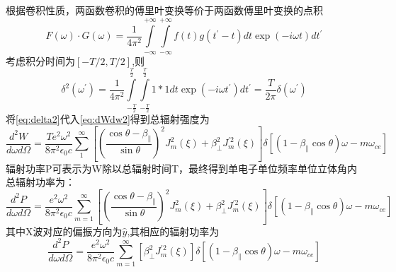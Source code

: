 根据卷积性质，两函数卷积的傅里叶变换等价于两函数傅里叶变换的点积
\begin{equation}
F(\omega) \cdot G(\omega)=\frac{1}{4 \pi^{2}} \int\limits_{-\infty}^{+\infty}\int\limits_{-\infty}^{+\infty} f(t) g\left(t^{\prime}-t\right)d t \exp (-i \omega t) d t^{\prime}
\end{equation}
考虑积分时间为$[-T/2,T/2]$,则
\begin{equation}\label{eq:delta2}
\delta^{2}\left(\omega^{\prime}\right)=\frac{1}{4 \pi^{2}} \int\limits_{-\frac{T}{2}}^{\frac{T}{2}}\int\limits_{-\frac{T}{2}}^{\frac{T}{2}} 1 * 1 d t \exp \left(-i \omega t^{\prime}\right) d t^{\prime}=\frac{T}{2 \pi} \delta\left(\omega^{\prime}\right)
\end{equation}
将\autoref{eq:delta2}代入\autoref{eq:dWdw2}得到总辐射强度为
\begin{equation}
\frac{d^{2} W}{d \omega d \Omega}=\frac{T e^{2} \omega^{2}}{8 \pi^{2} \epsilon_{0} c} \sum_{1}^{\infty}\left[\left(\frac{\cos \theta-\beta_{\|}}{\sin \theta}\right)^{2} J_{m}^{2}(\xi)+\beta_{\perp}^{2} J_{m}^{\prime 2}(\xi)\right] \delta\left[\left(1-\beta_{\|} \cos \theta\right) \omega-m \omega_{c e}\right]
\end{equation}
辐射功率P可表示为W除以总辐射时间T，最终得到单电子单位频率单位立体角内总辐射功率为：
\begin{equation}
\frac{d^{2} P}{d \omega d \Omega}=\frac{e^{2} \omega^{2}}{8 \pi^{2} \epsilon_{0} c} \sum_{m=1}^{\infty}\left[\left(\frac{\cos \theta-\beta_{\|}}{\sin \theta}\right)^{2} J_{m}^{2}(\xi)+\beta_{\perp}^{2} J_{m}^{\prime 2}(\xi)\right] \delta\left[\left(1-\beta_{\|} \cos \theta\right)\omega-m \omega_{c e}\right]
\end{equation}
其中X波对应的偏振方向为$\hat{y}$,其相应的辐射功率为
\begin{equation}\label{eq:Xradiation}
\frac{d^{2} P}{d \omega d \Omega}=\frac{e^{2} \omega^{2}}{8 \pi^{2} \epsilon_{0} c} \sum_{m=1}^{\infty}\left[\beta_{\perp}^{2} J_{m}^{\prime 2}(\xi)\right] \delta\left[\left(1-\beta_{\|} \cos \theta\right)\omega-m \omega_{c e}\right]
\end{equation}






